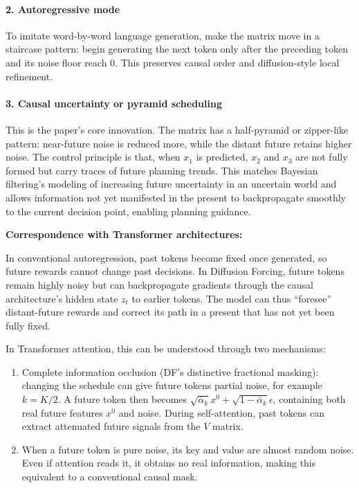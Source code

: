 \hypertarget{autoregressive-mode}{%
\paragraph{2. Autoregressive mode}\label{autoregressive-mode}}

To imitate word-by-word language generation, make the matrix move in a staircase pattern: begin generating the next token only after the preceding token and its noise floor reach 0. This preserves causal order and diffusion-style local refinement.

\hypertarget{causal-uncertainty-or-pyramid-scheduling}{%
\paragraph{3. Causal uncertainty or pyramid scheduling}\label{causal-uncertainty-or-pyramid-scheduling}}

This is the paper's core innovation. The matrix has a half-pyramid or zipper-like pattern: near-future noise is reduced more, while the distant future retains higher noise. The control principle is that, when \(x_1\) is predicted, \(x_2\) and \(x_3\) are not fully formed but carry traces of future planning trends. This matches Bayesian filtering's modeling of increasing future uncertainty in an uncertain world and allows information not yet manifested in the present to backpropagate smoothly to the current decision point, enabling planning guidance.

\textbf{Correspondence with Transformer architectures:}

In conventional autoregression, past tokens become fixed once generated, so future rewards cannot change past decisions. In Diffusion Forcing, future tokens remain highly noisy but can backpropagate gradients through the causal architecture's hidden state \(z_t\) to earlier tokens. The model can thus ``foresee'' distant-future rewards and correct its path in a present that has not yet been fully fixed.

In Transformer attention, this can be understood through two mechanisms:

\begin{enumerate}
\def\labelenumi{\arabic{enumi}.}
\tightlist
\item
  Complete information occlusion (DF's distinctive fractional masking): changing the schedule can give future tokens partial noise, for example \(k=K/2\). A future token then becomes \(\sqrt{\bar{\alpha}_k}x^0+\sqrt{1-\bar{\alpha}_k}\epsilon\), containing both real future features \(x^0\) and noise. During self-attention, past tokens can extract attenuated future signals from the \(V\) matrix.
\item
  When a future token is pure noise, its key and value are almost random noise. Even if attention reads it, it obtains no real information, making this equivalent to a conventional causal mask.
\end{enumerate}

